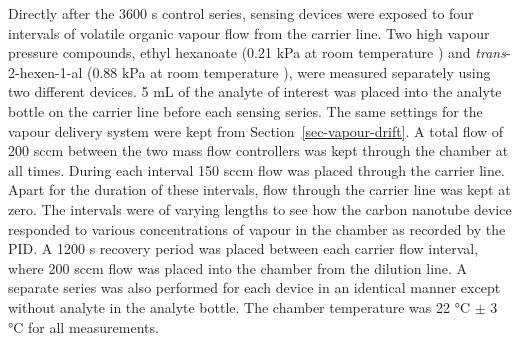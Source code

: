 \documentclass[
  a4paper,
]{scrbook}
\begin{document}
Directly after the 3600 s control series, sensing devices were exposed
to four intervals of volatile organic vapour flow from the carrier line.
Two high vapour pressure compounds, ethyl hexanoate (0.21 kPa at room
temperature \autocite{EtHex}) and \emph{trans}-2-hexen-1-al (0.88 kPa at
room temperature \autocite{E2Hex}), were measured separately using two
different devices. 5 mL of the analyte of interest was placed into the
analyte bottle on the carrier line before each sensing series. The same
settings for the vapour delivery system were kept from
Section~\ref{sec-vapour-drift}. A total flow of 200 sccm between the two
mass flow controllers was kept through the chamber at all times. During
each interval 150 sccm flow was placed through the carrier line. Apart
for the duration of these intervals, flow through the carrier line was
kept at zero. The intervals were of varying lengths to see how the
carbon nanotube device responded to various concentrations of vapour in
the chamber as recorded by the PID. A 1200 s recovery period was placed
between each carrier flow interval, where 200 sccm flow was placed into
the chamber from the dilution line. A separate series was also performed
for each device in an identical manner except without analyte in the
analyte bottle. The chamber temperature was 22 °C \(\pm\) 3 °C for all
measurements.
\end{document}
